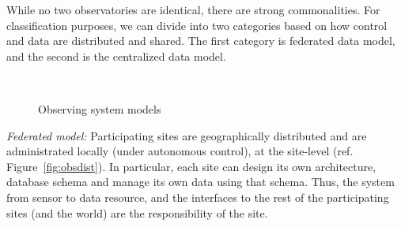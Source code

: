 While no two observatories are identical, there are strong commonalities. For classification purposes, we can divide into two categories based on how control and data are distributed and shared. The first category is federated data model, and the second is the centralized data model. 

\begin{figure}
\begin{center}
\mbox{
 \quad
{}
}
\caption{Observing system models}
\label{fig:obsmodel}
\end{center}
\end{figure}    

\emph{Federated model:} Participating sites are geographically distributed and are administrated locally (under autonomous control), at the site-level (ref. Figure~\ref{fig:obsdist}). In particular, each site can design its own architecture, database schema and manage its own data using that schema. Thus, the system from sensor to data resource, and the interfaces to the rest of the participating sites (and the world) are the responsibility of the site. 

